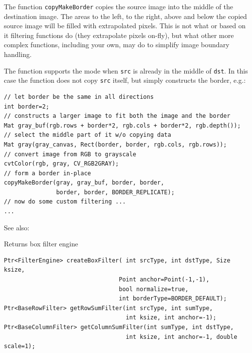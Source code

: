 The function \texttt{copyMakeBorder} copies the source image into the middle of the destination image. The areas to the left, to the right, above and below the copied source image will be filled with extrapolated pixels. This is not what  or based on it filtering functions do (they extrapolate pixels on-fly), but what other more complex functions, including your own, may do to simplify image boundary handling.

The function supports the mode when \texttt{src} is already in the middle of \texttt{dst}. In this case the function does not copy \texttt{src} itself, but simply constructs the border, e.g.:

\begin{lstlisting}
// let border be the same in all directions
int border=2;
// constructs a larger image to fit both the image and the border
Mat gray_buf(rgb.rows + border*2, rgb.cols + border*2, rgb.depth());
// select the middle part of it w/o copying data
Mat gray(gray_canvas, Rect(border, border, rgb.cols, rgb.rows));
// convert image from RGB to grayscale
cvtColor(rgb, gray, CV_RGB2GRAY);
// form a border in-place
copyMakeBorder(gray, gray_buf, border, border,
               border, border, BORDER_REPLICATE);
// now do some custom filtering ...
...
\end{lstlisting}

See also: 

\label{createBoxFilter}
Returns box filter engine

\begin{lstlisting}
Ptr<FilterEngine> createBoxFilter( int srcType, int dstType, Size ksize,
                                 Point anchor=Point(-1,-1),
                                 bool normalize=true,
                                 int borderType=BORDER_DEFAULT);
Ptr<BaseRowFilter> getRowSumFilter(int srcType, int sumType,
                                   int ksize, int anchor=-1);
Ptr<BaseColumnFilter> getColumnSumFilter(int sumType, int dstType,
                                   int ksize, int anchor=-1, double scale=1);
\end{lstlisting}
\begin{description}
\end{description}

